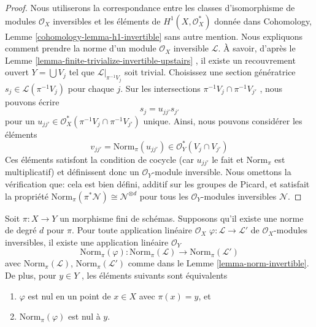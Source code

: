 \begin{proof}
Nous utiliserons la correspondance entre les classes d'isomorphisme de modules
 $\mathcal{O}_X$ inversibles et les éléments de  $H^1(X, \mathcal{O}_X^*)$  donnée dans Cohomology,
Lemme  \ref{cohomology-lemma-h1-invertible}  sans autre mention. Nous expliquons comment prendre la norme
d'un module  $\mathcal{O}_X$ inversible  $\mathcal{L}$. À savoir, d'après le Lemme
 \ref{lemma-finite-trivialize-invertible-upstairs} , il existe un recouvrement ouvert  $Y = \bigcup V_j$  tel que  $\mathcal{L}|_{\pi^{-1}V_j}$ 
soit trivial. Choisissez une section génératrice  $s_j \in \mathcal{L}(\pi^{-1}V_j)$  pour chaque
 $j$. Sur les intersections  $\pi^{-1}V_j \cap \pi^{-1}V_{j'}$ , nous pouvons écrire
$$
s_j = u_{jj'} s_{j'}
$$
pour un  $u_{jj'} \in \mathcal{O}^*_X(\pi^{-1}V_j \cap \pi^{-1}V_{j'})$ unique. Ainsi, nous pouvons considérer les éléments
$$
v_{jj'} = \text{Norm}_\pi(u_{jj'}) \in \mathcal{O}_Y^*(V_j \cap V_{j'})
$$
Ces éléments satisfont la condition de cocycle (car  $u_{jj'}$  le fait et
 $\text{Norm}_\pi$  est multiplicatif) et définissent donc un  $\mathcal{O}_Y$-module
inversible. Nous omettons la vérification que: cela est bien défini, additif sur
les groupes de Picard, et satisfait la propriété  $\text{Norm}_\pi(\pi^*\mathcal{N}) \cong \mathcal{N}^{\otimes d}$  pour tous les
 $\mathcal{O}_Y$-modules inversibles  $\mathcal{N}$.
\end{proof}

\begin{lemma}
\label{lemma-norm-map-invertible}
Soit  $\pi : X \to Y$  un morphisme fini de schémas. Supposons qu'il existe une norme
de degré  $d$  pour  $\pi$. Pour toute application linéaire
 $\mathcal{O}_X$  $\varphi : \mathcal{L} \to \mathcal{L}'$  de  $\mathcal{O}_X$-modules inversibles, il existe une
application linéaire  $\mathcal{O}_Y$
$$
\text{Norm}_\pi(\varphi) :
\text{Norm}_\pi(\mathcal{L})
\longrightarrow
\text{Norm}_\pi(\mathcal{L}')
$$
avec  $\text{Norm}_\pi(\mathcal{L})$,  $\text{Norm}_\pi(\mathcal{L}')$  comme dans le Lemme  \ref{lemma-norm-invertible}. De plus, pour
 $y \in Y$ , les éléments suivants sont équivalents
\begin{enumerate}
\item $\varphi$  est nul en un point de  $x \in X$  avec  $\pi(x) = y$, et
\item $\text{Norm}_\pi(\varphi)$  est nul à  $y$.
\end{enumerate}
\end{lemma}

